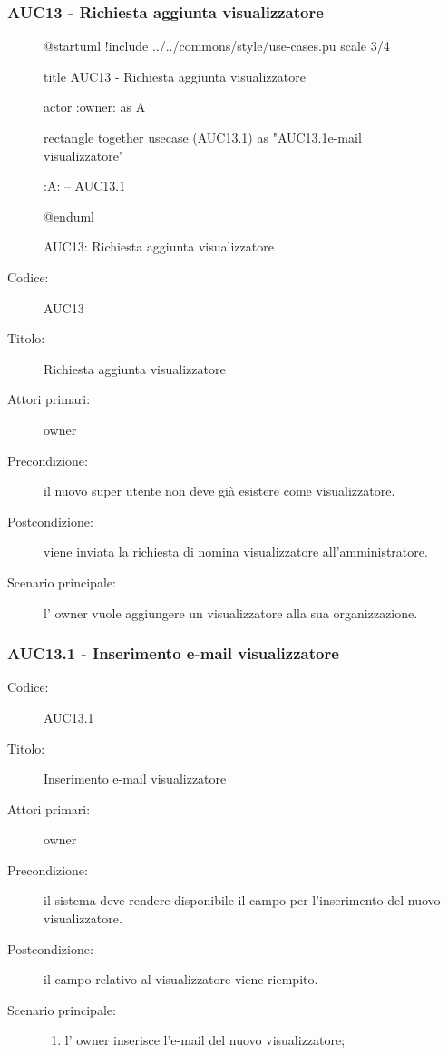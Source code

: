\documentclass[casi-duso]{subfiles}
\begin{document}
\subsubsection{AUC13 - Richiesta aggiunta visualizzatore}%
\label{subsub:AUC13}

\begin{figure}[h!] 
  \centering 
  \begin{plantuml}
  @startuml
  !include ../../commons/style/use-cases.pu
  scale 3/4

  title AUC13 - Richiesta aggiunta visualizzatore

  actor :owner: as A

  rectangle {
    together {
      usecase (AUC13.1) as "AUC13.1\nInserimento e-mail visualizzatore"
    }
  }

  :A: -- AUC13.1

  @enduml
  \end{plantuml} 
  \caption{AUC13: Richiesta aggiunta visualizzatore} 
  \label{fig:auc13} 
\end{figure}

\begin{description}
  \item[Codice:] AUC13
  \item[Titolo:] Richiesta aggiunta visualizzatore
  \item[Attori primari:] owner
  \item[Precondizione:] il nuovo super utente non deve già esistere come visualizzatore.
  \item[Postcondizione:] viene inviata la richiesta di nomina visualizzatore all'amministratore.
  \item[Scenario principale:] l' owner vuole aggiungere un visualizzatore alla sua organizzazione.
\end{description}

\subsubsection{AUC13.1 - Inserimento e-mail visualizzatore}%
\label{subsub:AUC13.1}
\begin{description}
  \item[Codice:] AUC13.1
  \item[Titolo:] Inserimento e-mail visualizzatore
  \item[Attori primari:] owner
  \item[Precondizione:] il sistema deve rendere disponibile il campo per l'inserimento del nuovo visualizzatore.
  \item[Postcondizione:] il campo relativo al visualizzatore viene riempito.
  \item[Scenario principale:] 
  \begin{enumerate}
    \item l' owner inserisce l'e-mail del nuovo visualizzatore;
  \end{enumerate}
\end{description}
\end{document}
